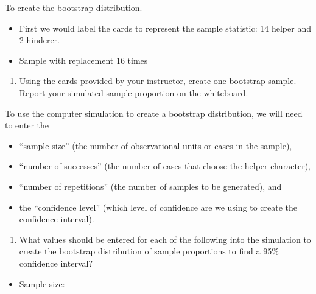 \documentclass[
]{report}
\providecommand{\tightlist}{%
  \setlength{\itemsep}{0pt}\setlength{\parskip}{0pt}}
\begin{document}
\vspace{0.7in}

To create the bootstrap distribution.

\begin{itemize}
\item
  First we would label the cards to represent the sample statistic: 14 helper and 2 hinderer.
\item
  Sample with replacement 16 times
\end{itemize}

\begin{enumerate}
\def\labelenumi{\arabic{enumi}.}
\setcounter{enumi}{5}
\tightlist
\item
  Using the cards provided by your instructor, create one bootstrap sample. Report your simulated sample proportion on the whiteboard.
\end{enumerate}

\vspace{0.3in}

To use the computer simulation to create a bootstrap distribution, we will need to enter the

\begin{itemize}
\tightlist
\item
  ``sample size'' (the number of observational units or cases in the sample),
\item
  ``number of successes'' (the number of cases that choose the helper character),
\item
  ``number of repetitions'' (the number of samples to be generated), and
\item
  the ``confidence level'' (which level of confidence are we using to create the confidence interval).
\end{itemize}

\begin{enumerate}
\def\labelenumi{\arabic{enumi}.}
\setcounter{enumi}{6}
\tightlist
\item
  What values should be entered for each of the following into the simulation to create the bootstrap distribution of sample proportions to find a 95\% confidence interval?
  \vspace{1mm}
\end{enumerate}

\begin{itemize}
\tightlist
\item
  Sample size:
\end{itemize}

\vspace{.1in}
\end{document}
